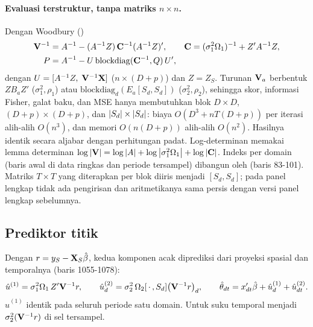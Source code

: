 \paragraph{Evaluasi terstruktur, tanpa matriks $n\times n$.} Dengan Woodbury
()
\begin{equation}
\begin{aligned}
  \mathbf{V}^{-1}&=A^{-1}-(A^{-1}Z)\,\mathbf C^{-1}(A^{-1}Z)',
  \qquad
  \mathbf C=(\sigma_1^2\Omega_1)^{-1}+Z'A^{-1}Z,\\
  P&=A^{-1}-U\,\mathrm{blockdiag}(\mathbf C^{-1},Q)\,U',
\end{aligned}
  \label{eq:stfh-woodbury}
\end{equation}
dengan $U=[A^{-1}Z,\;\mathbf{V}^{-1}\mathbf{X}]$ ($n\times(D+p)$) dan $Z=Z_S$. Turunan
$\mathbf{V}_a$ berbentuk $ZB_aZ'$ ($\sigma_1^2,\rho_1$) atau
$\mathrm{blockdiag}_d(E_a[S_d,S_d])$ ($\sigma_2^2,\rho_2$), sehingga skor,
informasi Fisher, galat baku, dan MSE hanya membutuhkan blok $D\times D$,
$(D+p)\times(D+p)$, dan $\left|S_d\right|\times\left|S_d\right|$: biaya $O(D^3+nT(D+p))$
per iterasi alih-alih $O(n^3)$, dan memori $O(n(D+p))$ alih-alih $O(n^2)$.
Hasilnya identik secara aljabar dengan perhitungan padat. Log-determinan
memakai lemma determinan
$\log\left|\mathbf{V}\right|=\log\left|A\right|+\log\left|\sigma_1^2\Omega_1\right|+\log\left|\mathbf C\right|$.
Indeks per domain (baris awal di data ringkas dan periode tersampel) dibangun
oleh  (baris 83-101). Matriks $T\times T$ yang
diterapkan per blok diiris menjadi $[S_d,S_d]$; pada panel lengkap tidak ada
pengirisan dan aritmetikanya sama persis dengan versi panel lengkap
sebelumnya.

\subsection{Prediktor titik}\label{sec:stfh-prediktor}

Dengan $r=y_S-\mathbf{X}_S\hat\beta$, kedua komponen acak diprediksi dari proyeksi
spasial dan temporalnya (baris 1055-1078):
\begin{equation}
  \hat u^{(1)}=\sigma_1^2\Omega_1\,Z'\mathbf{V}^{-1}r,
  \qquad
  \hat u^{(2)}_d=\sigma_2^2\,\Omega_2[\,\cdot\,,S_d]\bigl(\mathbf{V}^{-1}r\bigr)_d,
  \qquad
  \hat\theta_{dt}=x_{dt}'\hat\beta+\hat u^{(1)}_d+\hat u^{(2)}_{dt}.
  \label{eq:stfh-pred}
\end{equation}
$\hat u^{(1)}$ identik pada seluruh periode satu domain. Untuk
 suku temporal menjadi $\sigma_2^2(\mathbf{V}^{-1}r)$ di sel
tersampel.

